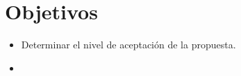 \section{Objetivos}


\begin{itemize}
    \item Determinar el nivel de aceptación de la propuesta.
    \item 

\end{itemize}
